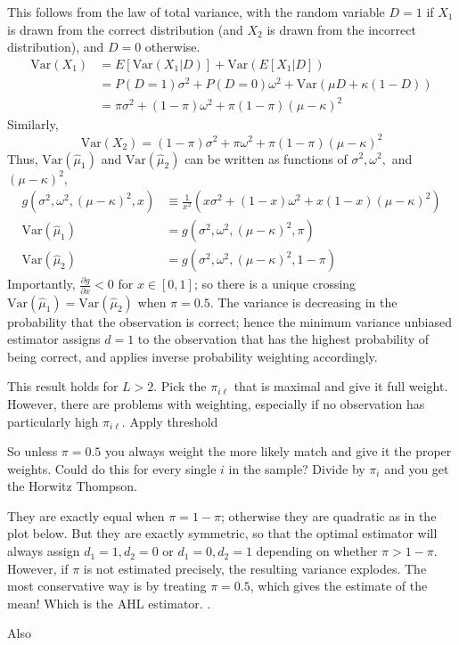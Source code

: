 \documentclass[11pt]{amsart}
\newcommand{\Var}[1]{\text{Var}\left(#1\right)}
\begin{document}
This follows from the law of total variance, with the random variable $D = 1$ if $X_1$ is drawn from the correct distribution (and $X_2$ is drawn from the incorrect distribution), and $D=0$ otherwise. 
\begin{align*} \Var{X_1} &= E[\Var{X_1 | D}] + \Var{E[X_1| D]} \\ 
&= P(D=1)\sigma^2 +  P(D=0)\omega^2 + \Var{\mu D + \kappa (1-D)} \\
&= \pi \sigma^2 + (1-\pi) \omega^2 + \pi(1-\pi)(\mu-\kappa)^2
\end{align*}
Similarly,
$$\Var{X_2} = (1-\pi)\sigma^2 + \pi \omega^2 + \pi(1-\pi)(\mu-\kappa)^2 $$ 
Thus, $\Var{\hat{\mu}_1}$ and $\Var{\hat{\mu}_2}$ can be written as functions of $\sigma^2, \omega^2,$ and $(\mu-\kappa)^2$,
\begin{align*} 
g(\sigma^2, \omega^2, (\mu-\kappa)^2, x) &\equiv  \frac{1}{x^2}\left(x \sigma^2 + (1-x)\omega^2 + x (1-x) (\mu -\kappa)^2\right)\\
\Var{\hat{\mu}_1} &= g(\sigma^2, \omega^2, (\mu-\kappa)^2, \pi) \\
\Var{\hat{\mu}_2} &= g(\sigma^2, \omega^2, (\mu-\kappa)^2, 1-\pi) 
\end{align*}
Importantly, $\frac{\partial g}{\partial x} < 0$ for $x \in [0,1]$; so there is a unique  crossing $\Var{\hat{\mu}_1} = \Var{\hat{\mu}_2}$ when $\pi = 0.5$.   The variance is decreasing in the probability that the observation is correct; hence the minimum variance unbiased estimator assigns $d=1$ to the observation that has the highest probability of being correct, and applies inverse probability weighting accordingly.  

This result holds for $L > 2$.   Pick the $\pi_{i\ell}$ that is maximal and give it full weight.  However, there are problems with weighting, especially if no observation has particularly high $\pi_{i\ell}$. Apply threshold


\newpage

So unless $\pi = 0.5$ you always weight the more likely match and give it the proper weights.  Could do this for every single $i$ in the sample?  Divide by $\pi_i$ and you get the Horwitz Thompson.    

They are exactly equal when $\pi = 1-\pi$; otherwise they are quadratic as in the plot below.   But they are exactly symmetric, so that the optimal estimator will always assign $d_1 = 1, d_2= 0$ or $d_1=0, d_2=1$ depending on whether $\pi > 1-\pi$.  However, if $\pi$ is not estimated precisely, the resulting variance explodes.  The most conservative way is by treating $\pi = 0.5$, which gives the estimate of the mean!  Which is the AHL estimator. .

Also 
\end{document}
